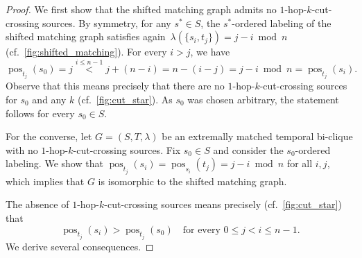 \documentclass[11pt, letterpaper]{article}
\DeclareMathOperator{\pos}{pos}
\theoremstyle{definition}
\theoremstyle{plain}
\begin{document}
\begin{proof}
We first show that the shifted matching graph admits no $1$-hop-$k$-cut-crossing sources. 
By symmetry, for any $s^*\in S$, the $s^*$-ordered labeling of the shifted matching graph satisfies again~$\lambda(\{s_i,t_j\})=j-i\bmod n$ (cf.~\cref{fig:shifted_matching}). 
For every $i>j$, we have
\[
  \pos_{t_j}(s_0)=j 
\overset{i\leq n-1}{<} j + (n-i) = n - (i-j)=j-i\bmod n=\pos_{t_j}(s_i).
\]
Observe that this means precisely that there are no $1$-hop-$k$-cut-crossing sources for $s_0$ and any $k$ (cf.~\cref{fig:cut_star}).
As $s_0$ was chosen arbitrary, the statement follows for every $s_0\in S$.

For the converse, let $G=(S,T,\lambda)$ be an extremally matched temporal bi-clique with no $1$-hop-$k$-cut-crossing sources. Fix $s_0\in S$ and consider the $s_0$-ordered labeling. 
We show that $\pos_{t_j}(s_i)=\pos_{s_i}(t_j)=j-i\bmod n$ for all $i,j$, which implies that $G$ is isomorphic to the shifted matching graph.

The absence of $1$-hop-$k$-cut-crossing sources means precisely (cf.~\cref{fig:cut_star}) that
\begin{equation}\label{eq:no_cut_cross}
  \pos_{t_j}(s_i)>\pos_{t_j}(s_0)\quad\text{for every }0\leq  j<i\leq n-1.
\end{equation}
We derive several consequences. 


\end{proof}
\end{document}
